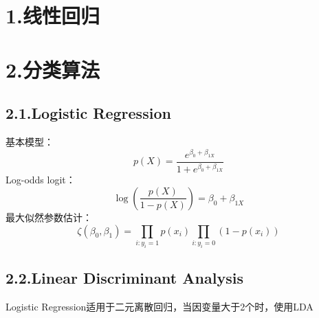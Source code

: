 \documentclass{article}
\begin{document}
{\begin{mdtoc}
\begin{mdtocblock}
\begin{mdtocblock}
\begin{mdtocblock}
\end{mdtocblock}%
\end{mdtocblock}%
\end{mdtocblock}%
\end{mdtoc}%

\section{1.\hspace*{0.5em}线性回归}\label{section}%

\section{2.\hspace*{0.5em}分类算法}\label{section}%

\subsection{2.1.\hspace*{0.5em}Logistic Regression}\label{sec-logistic-regression}%

\noindent{}基本模型：%
\label{}%
\noindent{}
\noindent\[%
p(X)=\frac{e^{\beta_0+\beta_{1X}}}{1+e^{\beta_0+\beta_{1X}}}
\]%
\noindent{}Log-odds logit：
\label{}%
\noindent{}
\noindent\[%
\log(\frac{p(X)}{1-p(X)}) = \beta_0+\beta_{1X}
\]%
\noindent{}最大似然参数估计：
\label{}%
\noindent{}
\noindent\[%
  \zeta(\beta_0,\beta_1)= \prod_{i:y_i=1}p(x_i)\prod_{i:y_i=0}(1-p(x_i))
\]%

\subsection{2.2.\hspace*{0.5em}Linear Discriminant Analysis}\label{sec-linear-discriminant-analysis}%

\noindent{}Logistic Regression适用于二元离散回归，当因变量大于2个时，使用LDA%

}
\end{document}
